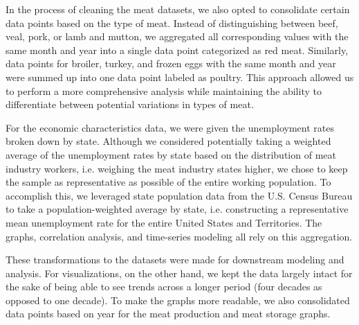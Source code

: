 \documentclass[12pt]{article}
\begin{document}
        In the process of cleaning the meat datasets, we also opted to consolidate certain data points based on the type of meat. Instead of distinguishing between beef, veal, pork, or lamb and mutton, we aggregated all corresponding values with the same month and year into a single data point categorized as red meat. Similarly, data points for broiler, turkey, and frozen eggs with the same month and year were summed up into one data point labeled as poultry. This approach allowed us to perform a more comprehensive analysis while maintaining the ability to differentiate between potential variations in types of meat.

        For the economic characteristics data, we were given the unemployment rates broken down by state. Although we considered potentially taking a weighted average of the unemployment rates by state based on the distribution of meat industry workers, i.e. weighing the meat industry states higher, we chose to keep the sample as representative as possible of the entire working population. To accomplish this, we leveraged state population data from the U.S. Census Bureau to take a population-weighted average by state, i.e. constructing a representative mean unemployment rate for the entire United States and Territories. The graphs, correlation analysis, and time-series modeling all rely on this aggregation.

        These transformations to the datasets were made for downstream modeling and analysis. For visualizations, on the other hand, we kept the data largely intact for the sake of being able to see trends across a longer period (four decades as opposed to one decade). To make the graphs more readable, we also consolidated data points based on year for the meat production and meat storage graphs.
\end{document}
